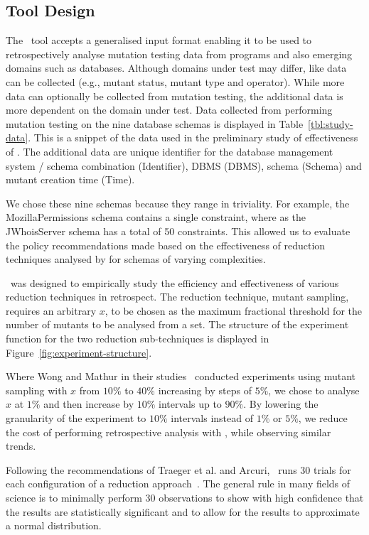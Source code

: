 \subsection{Tool Design}

The \mr~tool accepts a generalised input format enabling it to be used to retrospectively
analyse mutation testing data from programs and also emerging domains such as databases.
Although domains under test may differ, like data can be collected (e.g., mutant status,
mutant type and operator). While more data can optionally be collected from mutation
testing, the additional data is more dependent on the domain under test. Data collected
from performing mutation testing on the nine database schemas is displayed in Table~\ref{tbl:study-data}.
This is a snippet of the data used in the preliminary study of effectiveness of \mr.
The additional data are unique identifier for the database management system / schema combination
(Identifier), DBMS (DBMS), schema (Schema) and mutant creation time (Time).

We chose these nine schemas because they range in triviality. For example, the MozillaPermissions
schema contains a single constraint, where as the JWhoisServer schema has a total of 50
constraints. This allowed us to evaluate the policy recommendations made based on the
effectiveness of reduction techniques analysed by \mr for schemas of varying complexities.

\mr~was designed to empirically study the efficiency and effectiveness of various reduction
techniques in retrospect. The reduction technique, mutant sampling, requires an arbitrary
$x$, to be chosen as the maximum fractional threshold for the number of mutants to be analysed
from a set. The structure of the experiment function for the two
reduction sub-techniques is displayed in Figure~\ref{fig:experiment-structure}.

Where Wong and Mathur in their studies~\cite{mathur1994empirical, wong1993mutation} conducted
experiments using mutant sampling with $x$ from $10\%$ to $40\%$ increasing by steps of $5\%$, we
chose to analyse $x$ at $1\%$ and then increase by $10\%$ intervals up to $90\%$. By lowering
the granularity of the experiment to $10\%$ intervals instead of $1\%$ or $5\%$, we reduce the
cost of performing retrospective analysis with \mr, while observing similar trends.

Following the recommendations of Traeger et al. and Arcuri, \mr~runs 30 trials for each configuration
of a reduction approach~\cite{traeger2008nine, arcuri2014hitchhiker}. The general rule in many
fields of science is to minimally perform 30 observations to show with high confidence that the results
are statistically significant and to allow for the results to approximate a normal distribution.
